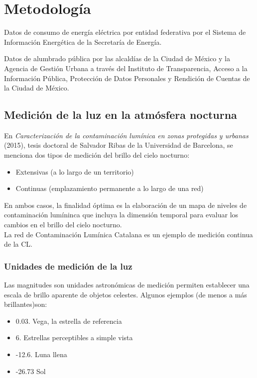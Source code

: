 \chapter{Metodología}

Datos de consumo de energía eléctrica por entidad federativa por el Sistema de Información Energética de la Secretaría de Energía.

Datos de alumbrado pública por las alcaldías de la Ciudad de México y la Agencia de Gestión Urbana a través del Instituto de Transparencia, Acceso a la Información Pública, Protección de Datos Personales y Rendición de Cuentas de la Ciudad de México.

\section{Medición de la luz en la atmósfera nocturna}

En \textit{Caracterización de la contaminación lumínica en zonas protegidas y urbanas} (2015), tesis doctoral de Salvador Ribas de la Universidad de Barcelona, se menciona dos tipos de medición del brillo del cielo nocturno:

\begin{itemize}

    \item Extensivas (a lo largo de un territorio)
    \item Continuas (emplazamiento permanente a lo largo de una red)     
    
\end{itemize}

En ambos casos, la finalidad óptima es la elaboración de un mapa de niveles de contaminación lumíninca que incluya la dimensión temporal para evaluar los cambios en el brillo del cielo nocturno.\\

La red de Contaminación Lumínica Catalana es un ejemplo de medición continua de la CL.

\subsection{Unidades de medición de la luz}

Las magnitudes son unidades astronómicas de medición permiten establecer una escala de brillo aparente de objetos celestes. Algunos ejemplos (de menos a más brillantes)son:

\begin{itemize}

    \item 0.03. Vega, la estrella de referencia
    \item 6. Estrellas perceptibles a simple vista
    \item -12.6. Luna llena
    \item -26.73 Sol
    
 \end{itemize}
 
